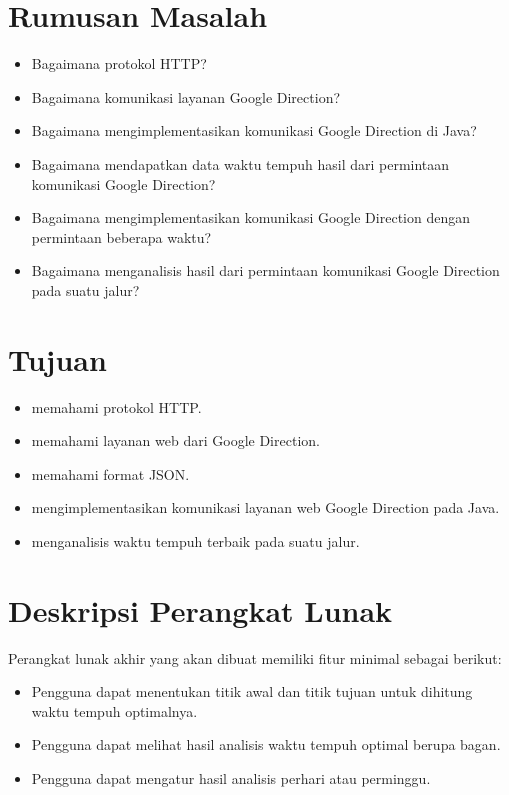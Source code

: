 \documentclass[a4paper,twoside]{article}
\begin{document}
\section{Rumusan Masalah}

\begin{itemize}
	\item Bagaimana protokol HTTP?
	\item Bagaimana komunikasi layanan Google Direction?
	\item Bagaimana mengimplementasikan komunikasi Google Direction di Java?
	\item Bagaimana mendapatkan data waktu tempuh hasil dari permintaan komunikasi Google Direction?
	\item Bagaimana mengimplementasikan komunikasi Google Direction dengan permintaan beberapa waktu?
	\item Bagaimana menganalisis hasil dari permintaan komunikasi Google Direction pada suatu jalur?
\end{itemize}

\section{Tujuan}

\begin{itemize}
	\item memahami protokol HTTP.
	\item memahami layanan web dari Google Direction.
	\item memahami format JSON.
	\item mengimplementasikan komunikasi layanan web Google Direction pada Java.
	\item menganalisis waktu tempuh terbaik pada suatu jalur.
\end{itemize}

\section{Deskripsi Perangkat Lunak}

Perangkat lunak akhir yang akan dibuat memiliki fitur minimal sebagai berikut:
\begin{itemize}
	\item Pengguna dapat menentukan titik awal dan titik tujuan untuk dihitung waktu tempuh optimalnya.
	\item Pengguna dapat melihat hasil analisis waktu tempuh optimal berupa bagan.
	\item Pengguna dapat mengatur hasil analisis perhari atau perminggu.
\end{itemize}
\end{document}
